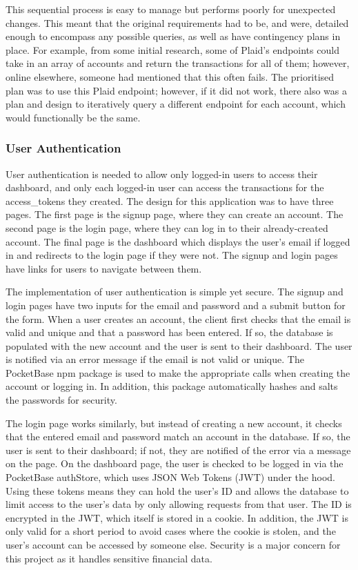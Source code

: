 This sequential process is easy to manage but performs poorly for unexpected changes. This meant that the original requirements had to be, and were, detailed enough to encompass any possible queries, as well as have contingency plans in place. For example, from some initial research, some of Plaid's endpoints could take in an array of accounts and return the transactions for all of them; however, online elsewhere, someone had mentioned that this often fails. The prioritised plan was to use this Plaid endpoint; however, if it did not work, there also was a plan and design to iteratively query a different endpoint for each account, which would functionally be the same.

\subsubsection{User Authentication}
User authentication is needed to allow only logged-in users to access their dashboard, and only each logged-in user can access the transactions for the access\_tokens they created. The design for this application was to have three pages. The first page is the signup page, where they can create an account. The second page is the login page, where they can log in to their already-created account. The final page is the dashboard which displays the user's email if logged in and redirects to the login page if they were not. The signup and login pages have links for users to navigate between them.

The implementation of user authentication is simple yet secure. The signup and login pages have two inputs for the email and password and a submit button for the form. When a user creates an account, the client first checks that the email is valid and unique and that a password has been entered. If so, the database is populated with the new account and the user is sent to their dashboard. The user is notified via an error message if the email is not valid or unique. The PocketBase npm package is used to make the appropriate calls when creating the account or logging in. In addition, this package automatically hashes and salts the passwords for security.

The login page works similarly, but instead of creating a new account, it checks that the entered email and password match an account in the database. If so, the user is sent to their dashboard; if not, they are notified of the error via a message on the page. On the dashboard page, the user is checked to be logged in via the PocketBase authStore, which uses JSON Web Tokens (JWT) under the hood. Using these tokens means they can hold the user's ID and allows the database to limit access to the user's data by only allowing requests from that user. The ID is encrypted in the JWT, which itself is stored in a cookie. In addition, the JWT is only valid for a short period to avoid cases where the cookie is stolen, and the user's account can be accessed by someone else. Security is a major concern for this project as it handles sensitive financial data.


